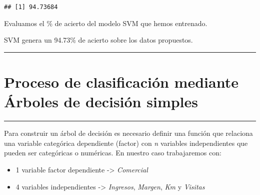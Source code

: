 \documentclass[]{article}
\newenvironment{Shaded}{\begin{snugshade}}{\end{snugshade}}
\newcommand{\KeywordTok}[1]{\textcolor[rgb]{0.94,0.87,0.69}{#1}}
\newcommand{\DecValTok}[1]{\textcolor[rgb]{0.86,0.86,0.80}{#1}}
\newcommand{\StringTok}[1]{\textcolor[rgb]{0.80,0.58,0.58}{#1}}
\newcommand{\CommentTok}[1]{\textcolor[rgb]{0.50,0.62,0.50}{#1}}
\newcommand{\OperatorTok}[1]{\textcolor[rgb]{0.94,0.94,0.82}{#1}}
\newcommand{\NormalTok}[1]{\textcolor[rgb]{0.80,0.80,0.80}{#1}}
\begin{document}
\begin{Shaded}
\end{Shaded}

\begin{verbatim}
## [1] 94.73684
\end{verbatim}

Evaluamos el \% de acierto del modelo SVM que hemos entrenado.

SVM genera un 94.73\% de acierto sobre los datos propuestos.

\begin{center}\rule{0.5\linewidth}{\linethickness}\end{center}

\section{Proceso de clasificación mediante Árboles de decisión
simples}\label{proceso-de-clasificacion-mediante-arboles-de-decision-simples}

\begin{center}\rule{0.5\linewidth}{\linethickness}\end{center}

Para construir un árbol de decisión es necesario definir una función que
relaciona una variable categórica dependiente (factor) con \emph{n}
variables independientes que pueden ser categóricas o numéricas. En
nuestro caso trabajaremos con:

\begin{itemize}
\item
  1 variable factor dependiente -\textgreater{} \emph{Comercial}
\item
  4 variables independientes -\textgreater{} \emph{Ingresos},
  \emph{Margen}, \emph{Km} y \emph{Visitas}
\end{itemize}
\end{document}
